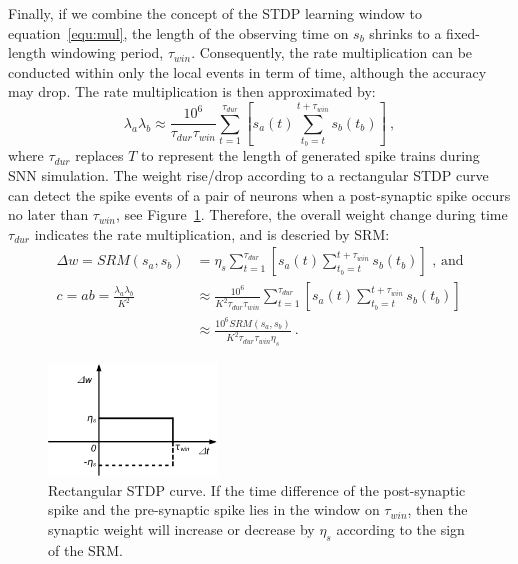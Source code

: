 Finally, if we combine the concept of the STDP learning window to equation~\ref{equ:mul}, the length of the observing time on $s_b$ shrinks to a fixed-length windowing period, $\tau_{win}$.
Consequently, the rate multiplication can be conducted within only the local events in term of time, although the accuracy may drop.
The rate multiplication is then approximated by:
\begin{equation}
\lambda_a \lambda_b \approx \frac{10^6}{\tau_{dur} \tau_{win}} \sum_{t=1}^{\tau_{dur}} [s_a(t) \sum_{t_b=t}^{t+\tau_{win}} s_b(t_b)]~,
\end{equation} 
where $\tau_{dur}$ replaces $T$ to represent the length of generated spike trains during SNN simulation.
The weight rise/drop according to a rectangular STDP curve can detect the spike events of a pair of neurons when a post-synaptic spike occurs no later than $\tau_{win}$, see Figure~\ref{fig:rtg_stdp}.
Therefore, the overall weight change during time $\tau_{dur}$ indicates the rate multiplication, and is descried by SRM:
\begin{equation}
\begin{aligned}
\Delta w = SRM(s_a, s_b) &= \eta_s \sum_{t=1}^{\tau_{dur}} [s_a(t) \sum_{t_b=t}^{t+\tau_{win}} s_b(t_b)] \text{~,~and}\\
c=ab=\frac{\lambda_a \lambda_b}{K^2} &\approx \frac{10^6}{K^2 \tau_{dur} \tau_{win}} \sum_{t=1}^{\tau_{dur}} [s_a(t) \sum_{t_b=t}^{t+\tau_{win}} s_b(t_b)] \\
&\approx  \frac{10^6 SRM(s_a, s_b)}{K^2 \tau_{dur} \tau_{win}  \eta_s}~.
\end{aligned}
\label{equ:srm}
\end{equation} 
\begin{figure}
	\centering
	\includegraphics[width=0.4\textwidth]{pics_sdlm/stdp.pdf}
	\caption{Rectangular STDP curve.
		If the time difference of the post-synaptic spike and the pre-synaptic spike lies in the window on $\tau_{win}$, then the synaptic weight will increase or decrease by $\eta_s$ according to the sign of the SRM.}
	\label{fig:rtg_stdp}
\end{figure}

